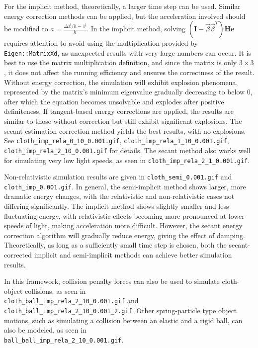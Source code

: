 \documentclass{article}
\begin{document}
For the implicit method, theoretically, a larger time step can be used. Similar energy correction methods can be applied, but the acceleration involved should be modified to $a = \frac{\Delta \vec{x} /h - \vec{v}} {h}$. In the implicit method, solving $(\mathbf{I} - \vec{\beta} \vec{\beta}^{T}) \mathbf{He}$ requires attention to avoid using the multiplication provided by \lstinline|Eigen::MatrixXd|, as unexpected results with very large numbers can occur. It is best to use the matrix multiplication definition, and since the matrix is only $3 \times 3$, it does not affect the running efficiency and ensures the correctness of the result. Without energy correction, the simulation will exhibit explosion phenomena, represented by the matrix's minimum eigenvalue gradually decreasing to below 0, after which the equation becomes unsolvable and explodes after positive definiteness. If tangent-based energy corrections are applied, the results are similar to those without correction but still exhibit significant explosions. The secant estimation correction method yields the best results, with no explosions. See \lstinline|cloth_imp_rela_0_10_0.001.gif|, \lstinline|cloth_imp_rela_1_10_0.001.gif|, \lstinline|cloth_imp_rela_2_10_0.001.gif| for details. The secant method also works well for simulating very low light speeds, as seen in \lstinline|cloth_imp_rela_2_1_0.001.gif|.

Non-relativistic simulation results are given in \lstinline|cloth_semi_0.001.gif| and \lstinline|cloth_imp_0.001.gif|. In general, the semi-implicit method shows larger, more dramatic energy changes, with the relativistic and non-relativistic cases not differing significantly. The implicit method shows slightly smaller and less fluctuating energy, with relativistic effects becoming more pronounced at lower speeds of light, making acceleration more difficult. However, the secant energy correction algorithm will gradually reduce energy, giving the effect of damping. Theoretically, as long as a sufficiently small time step is chosen, both the secant-corrected implicit and semi-implicit methods can achieve better simulation results.

In this framework, collision penalty forces can also be used to simulate cloth-object collisions, as seen in \\ \lstinline|cloth_ball_imp_rela_2_10_0.001.gif| and \lstinline|cloth_ball_imp_rela_2_10_0.001_2.gif|. Other spring-particle type object motions, such as simulating a collision between an elastic and a rigid ball, can also be modeled, as seen in \\ \lstinline|ball_ball_imp_rela_2_10_0.001.gif|.
\end{document}
